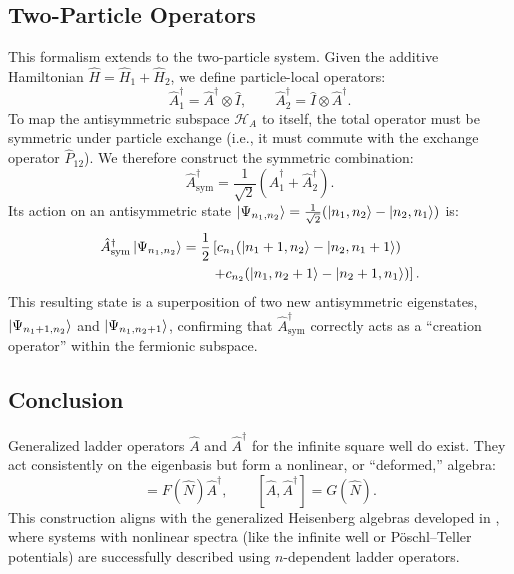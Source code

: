 \subsection{Two-Particle Operators}

This formalism extends to the two-particle system.
Given the additive Hamiltonian $\hat{H} = \hat{H}_1 + \hat{H}_2$,
we define particle-local operators:
\begin{equation}
  \hat{A}_1^\dagger = \hat{A}^\dagger \otimes \hat{I}, \qquad
  \hat{A}_2^\dagger = \hat{I} \otimes \hat{A}^\dagger.
\end{equation}
To map the antisymmetric subspace $\mathcal{H}_A$ to itself,
the total operator must be symmetric under particle exchange
(i.e., it must commute with the exchange operator $\hat{P}_{12}$).
We therefore construct the symmetric combination:
\begin{equation}
  \hat{A}_{\text{sym}}^\dagger = \frac{1}{\sqrt{2}}
  \left(\hat{A}_1^\dagger + \hat{A}_2^\dagger\right).
\end{equation}
Its action on an antisymmetric state $\ket{\Psi_{n_1, n_2}} =
\frac{1}{\sqrt{2}}(\ket{n_1, n_2} - \ket{n_2, n_1})$ is:
\begin{align}
  \hat{A}_{\text{sym}}^\dagger \ket{\Psi_{n_1, n_2}}
    = \frac{1}{2} & \left[
      c_{n_1}(\ket{n_1+1, n_2} - \ket{n_2, n_1+1}) \right. \nonumber \\
    & \left. + c_{n_2}(\ket{n_1, n_2+1} - \ket{n_2+1, n_1})
      \right].
\end{align}
This resulting state is a superposition of two new antisymmetric
eigenstates, $\ket{\Psi_{n_1+1, n_2}}$ and $\ket{\Psi_{n_1, n_2+1}}$,
confirming that $\hat{A}_{\text{sym}}^\dagger$ correctly
acts as a ``creation operator'' within the fermionic subspace.

\subsection{Conclusion}

Generalized ladder operators $\hat{A}$ and $\hat{A}^\dagger$
for the infinite square well do exist. They act consistently
on the eigenbasis but form a nonlinear, or ``deformed,'' algebra:
\begin{equation}
  [\hat{H}_0,\hat{A}^\dagger] = F(\hat{N})\hat{A}^\dagger, \qquad
  [\hat{A},\hat{A}^\dagger] = G(\hat{N}).
\end{equation}
This construction aligns with the generalized Heisenberg algebras
developed in \cite{CohenTanoudji2023, Jalali2013, Curado2001},
where systems with nonlinear spectra (like the infinite well or
Pöschl–Teller potentials) are successfully described using
$n$-dependent ladder operators.
